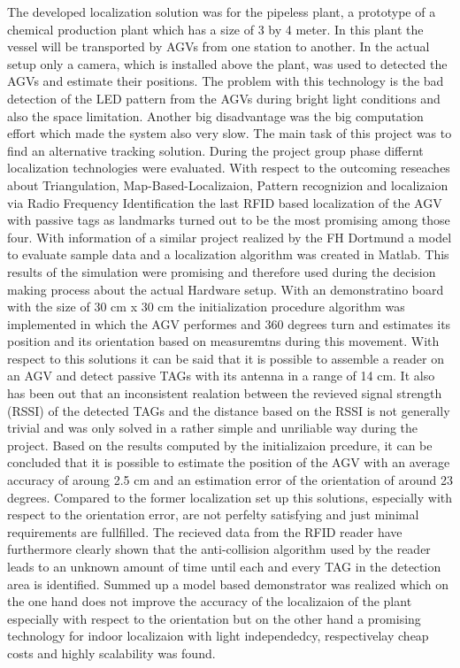The developed localization solution was for the pipeless plant, a prototype of a chemical production plant which has a size of 3 by 4 meter. In this plant the vessel will be transported by AGVs from one station to another. In the actual setup only a camera, which is installed above the plant, was used to detected the AGVs and estimate their positions. The problem with this technology is the bad detection of the LED pattern from the AGVs during bright light conditions and also the space limitation. Another big disadvantage was the big computation effort which made the system also very slow. The main task of this project was to find an alternative tracking solution. During the project group phase differnt localization technologies were evaluated. With respect to the outcoming reseaches about Triangulation, Map-Based-Localizaion, Pattern recognizion and localizaion via Radio Frequency Identification the last RFID based localization of the AGV with passive tags as landmarks turned out to be the most promising among those four. With information of a similar project realized by the FH Dortmund a model to evaluate sample data and a localization algorithm was created in Matlab. This results of the simulation were promising and  therefore used during the decision making process about the actual Hardware setup. With an demonstratino board with the size of 30 cm x 30 cm the initialization procedure algorithm was implemented in which the AGV performes and 360 degrees turn and estimates its position and its orientation based on measuremtns during this movement. With respect to this solutions it can be said that it is possible to assemble a reader on an AGV and detect passive TAGs with its antenna in a range of 14 cm. It also has been out that an inconsistent realation between the revieved signal strength (RSSI) of the detected TAGs and the distance based on the RSSI is not generally trivial and was only solved in a rather simple and unriliable way during the project. Based on the results computed by the initializaion prcedure, it can be concluded that it is possible to estimate the position of the AGV with an average accuracy of aroung 2.5 cm and an estimation error of the orientation of around 23 degrees. Compared to the former localization set up this solutions, especially with respect to the orientation error, are not perfelty satisfying and just minimal requirements are fullfilled. The recieved data from the RFID reader have furthermore clearly shown that the anti-collision algorithm used by the reader leads to an unknown amount of time until each and every TAG in the detection area is identified. Summed up a model based demonstrator was realized which on the one hand does not improve the accuracy of the localizaion of the plant especially with respect to the orientation but on the other hand a promising technology for indoor localizaion with light independedcy, respectivelay cheap costs and highly scalability was found. 




